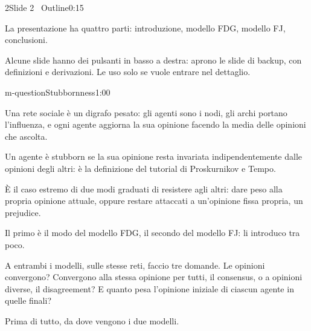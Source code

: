 \begin{slidepag}{2}{Slide 2 \textperiodcentered\ Outline}{0:15}
  \begin{discorso}
    \item La presentazione ha quattro parti: introduzione, modello FDG, modello FJ, conclusioni.
    \item Alcune slide hanno dei pulsanti in basso a destra: aprono le slide di backup, con definizioni e derivazioni. Le uso solo se vuole entrare nel dettaglio.
  \end{discorso}
\end{slidepag}

\begin{slide}{m-question}{Stubbornness}{1:00}
  \begin{discorso}
    \item Una rete sociale è un digrafo pesato: gli agenti sono i nodi, gli archi portano l'influenza, e ogni agente aggiorna la sua opinione facendo la media delle opinioni che ascolta.
    \item Un agente è stubborn se la sua opinione resta invariata indipendentemente dalle opinioni degli altri: è la definizione del tutorial di Proskurnikov e Tempo.
    \item È il caso estremo di due modi graduati di resistere agli altri: dare peso alla propria opinione attuale, oppure restare attaccati a un'opinione fissa propria, un prejudice.
    \item Il primo è il modo del modello FDG, il secondo del modello FJ: li introduco tra poco.
    \item A entrambi i modelli, sulle stesse reti, faccio tre domande. Le opinioni convergono? Convergono alla stessa opinione per tutti, il consensus, o a opinioni diverse, il disagreement? E quanto pesa l'opinione iniziale di ciascun agente in quelle finali?
    \item Prima di tutto, da dove vengono i due modelli.
  \end{discorso}
\end{slide}

